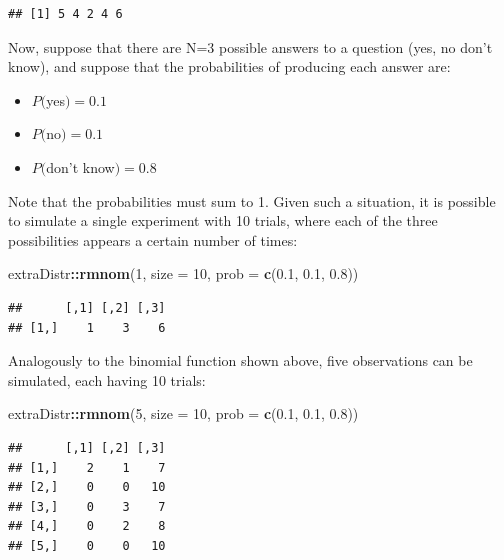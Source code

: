 \documentclass[12pt,]{krantz}
\newenvironment{Shaded}{\begin{snugshade}}{\end{snugshade}}
\newcommand{\DataTypeTok}[1]{\textcolor[rgb]{0.13,0.29,0.53}{#1}}
\newcommand{\DecValTok}[1]{\textcolor[rgb]{0.00,0.00,0.81}{#1}}
\newcommand{\FloatTok}[1]{\textcolor[rgb]{0.00,0.00,0.81}{#1}}
\newcommand{\KeywordTok}[1]{\textcolor[rgb]{0.13,0.29,0.53}{\textbf{#1}}}
\newcommand{\NormalTok}[1]{#1}
\newcommand{\OperatorTok}[1]{\textcolor[rgb]{0.81,0.36,0.00}{\textbf{#1}}}
\providecommand{\tightlist}{%
  \setlength{\itemsep}{0pt}\setlength{\parskip}{0pt}}
\theoremstyle{definition}
\theoremstyle{definition}
\theoremstyle{definition}
\theoremstyle{remark}
\begin{document}
\begin{verbatim}
## [1] 5 4 2 4 6
\end{verbatim}

Now, suppose that there are N=3 possible answers to a question (yes, no don't know), and suppose that the probabilities of producing each answer are:

\begin{itemize}
\tightlist
\item
  \(P(\)yes\()=0.1\)
\item
  \(P(\)no\()=0.1\)
\item
  \(P(\)don't know\()=0.8\)
\end{itemize}

Note that the probabilities must sum to 1. Given such a situation, it is possible to simulate a single experiment with 10 trials, where each of the three possibilities appears a certain number of times:

\begin{Shaded}
\begin{Highlighting}[]
\NormalTok{extraDistr}\OperatorTok{::}\KeywordTok{rmnom}\NormalTok{(}\DecValTok{1}\NormalTok{, }\DataTypeTok{size =} \DecValTok{10}\NormalTok{, }\DataTypeTok{prob =} \KeywordTok{c}\NormalTok{(}\FloatTok{0.1}\NormalTok{, }\FloatTok{0.1}\NormalTok{, }\FloatTok{0.8}\NormalTok{))}
\end{Highlighting}
\end{Shaded}

\begin{verbatim}
##      [,1] [,2] [,3]
## [1,]    1    3    6
\end{verbatim}

Analogously to the binomial function shown above, five observations can be simulated, each having 10 trials:

\begin{Shaded}
\begin{Highlighting}[]
\NormalTok{extraDistr}\OperatorTok{::}\KeywordTok{rmnom}\NormalTok{(}\DecValTok{5}\NormalTok{, }\DataTypeTok{size =} \DecValTok{10}\NormalTok{, }\DataTypeTok{prob =} \KeywordTok{c}\NormalTok{(}\FloatTok{0.1}\NormalTok{, }\FloatTok{0.1}\NormalTok{, }\FloatTok{0.8}\NormalTok{))}
\end{Highlighting}
\end{Shaded}

\begin{verbatim}
##      [,1] [,2] [,3]
## [1,]    2    1    7
## [2,]    0    0   10
## [3,]    0    3    7
## [4,]    0    2    8
## [5,]    0    0   10
\end{verbatim}
\end{document}
